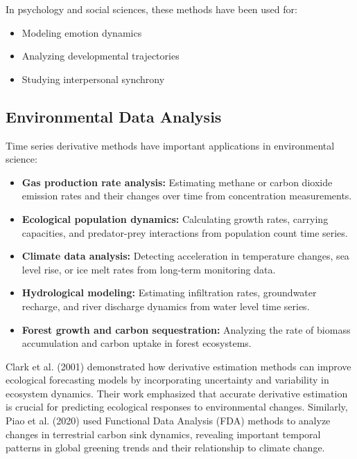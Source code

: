 \documentclass{article}
\begin{document}
In psychology and social sciences, these methods have been used for:

\begin{itemize}
    \item Modeling emotion dynamics
    \item Analyzing developmental trajectories
    \item Studying interpersonal synchrony
\end{itemize}

\subsection{Environmental Data Analysis}

Time series derivative methods have important applications in environmental science:

\begin{itemize}
    \item \textbf{Gas production rate analysis:} Estimating methane or carbon dioxide emission rates and their changes over time from concentration measurements.
    
    \item \textbf{Ecological population dynamics:} Calculating growth rates, carrying capacities, and predator-prey interactions from population count time series.
    
    \item \textbf{Climate data analysis:} Detecting acceleration in temperature changes, sea level rise, or ice melt rates from long-term monitoring data.
    
    \item \textbf{Hydrological modeling:} Estimating infiltration rates, groundwater recharge, and river discharge dynamics from water level time series.
    
    \item \textbf{Forest growth and carbon sequestration:} Analyzing the rate of biomass accumulation and carbon uptake in forest ecosystems.
\end{itemize}

Clark et al. (2001) demonstrated how derivative estimation methods can improve ecological forecasting models by incorporating uncertainty and variability in ecosystem dynamics. Their work emphasized that accurate derivative estimation is crucial for predicting ecological responses to environmental changes. Similarly, Piao et al. (2020) used Functional Data Analysis (FDA) methods to analyze changes in terrestrial carbon sink dynamics, revealing important temporal patterns in global greening trends and their relationship to climate change.
\end{document}

